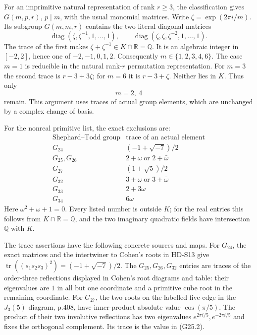For an imprimitive natural representation of rank \(r\ge3\),
the classification gives \(G(m,p,r)\), \(p\mid m\), with
the usual monomial matrices. Write
\(\zeta=\exp(2\pi i/m)\). Its subgroup \(G(m,m,r)\)
contains the two literal diagonal matrices
\[
 \operatorname{diag}(\zeta,\zeta^{-1},1,\ldots,1),\qquad
 \operatorname{diag}(\zeta,\zeta,\zeta^{-2},1,\ldots,1).
\]
The trace of the first makes
\(\zeta+\zeta^{-1}\in K\cap\mathbb R=\mathbb Q\).
It is an algebraic integer in \([-2,2]\), hence one of
\(-2,-1,0,1,2\). Consequently
\(m\in\{1,2,3,4,6\}\). The case \(m=1\) is reducible
in the natural rank-\(r\) permutation representation.
For \(m=3\) the second trace is \(r-3+3\zeta\);
for \(m=6\) it is \(r-3+\zeta\).
Neither lies in \(K\). Thus only
\[
                           m=2,\ 4                         \tag{G25.1}
\]
remain. This argument uses traces of actual group elements,
which are unchanged by a complex change of basis.

For the nonreal primitive list, the exact exclusions are:
\[
\begin{array}{c|l}
\text{Shephard--Todd group}&\text{trace of an actual element}\\ \hline
G_{24}&(-1+\sqrt{-7})/2\\
G_{25},G_{26}&2+\omega\ \text{or }2+\bar\omega\\
G_{27}&(1+\sqrt5)/2\\
G_{32}&3+\omega\ \text{or }3+\bar\omega\\
G_{33}&2+3\omega\\
G_{34}&6\omega
\end{array}                                                \tag{G25.2}
\]
Here \(\omega^2+\omega+1=0\).
Every listed number is outside \(K\); for the real entries
this follows from \(K\cap\mathbb R=\mathbb Q\), and the
two imaginary quadratic fields have intersection \(\mathbb Q\)
with \(K\).

The trace assertions have the following concrete sources and
maps. For \(G_{24}\), the exact matrices and the intertwiner
to Cohen's roots in HD-S13 give
\(\operatorname{tr}((s_1s_2s_3)^2)=(-1+\sqrt{-7})/2\).
The \(G_{25},G_{26},G_{32}\) entries are traces of the
order-three reflections displayed in Cohen's root diagrams and
table: their eigenvalues are \(1\) in all but one coordinate
and a primitive cube root in the remaining coordinate.
For \(G_{27}\), the two roots on the labelled five-edge in
the \(J_3(5)\) diagram, p.408, have inner-product absolute
value \(\cos(\pi/5)\). The product of their two involutive
reflections has two eigenvalues \(e^{2\pi i/5},e^{-2\pi i/5}\)
and fixes the orthogonal complement. Its trace is the value
in (G25.2).

